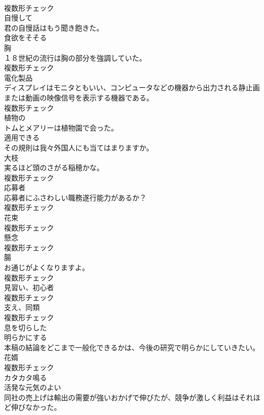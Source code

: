 \documentclass[8pt]{extreport}
\begin{document}
\begin{CJK}{UTF8}{min}
\\	複数形チェック
\\	[形容詞]	自慢して	
\\	君の自慢話はもう聞き飽きた。	
\\	[形容詞]	食欲をそそる	
\\	[名詞]	胸	
\\	１８世紀の流行は胸の部分を強調していた。	
\\	複数形チェック
\\	[名詞]	電化製品	
\\	ディスプレイはモニタともいい、コンピュータなどの機器から出力される静止画または動画の映像信号を表示する機器である。	
\\	複数形チェック
\\	[形容詞]	植物の	
\\	トムとメアリーは植物園で会った。	
\\	[形容詞]	適用できる	
\\	その規則は我々外国人にも当てはまりますか。	
\\	[名詞]	大枝	
\\	実るほど頭のさがる稲穂かな。	
\\	複数形チェック
\\	[名詞]	応募者	
\\	応募者にふさわしい職務遂行能力があるか？	
\\	複数形チェック
\\	[名詞]	花束	
\\	複数形チェック
\\	[名詞]	懸念	
\\	複数形チェック
\\	[名詞]	腸	
\\	お通じがよくなりますよ。	
\\	複数形チェック
\\	[名詞]	見習い、初心者	
\\	複数形チェック
\\	[名詞]	支え、同類	
\\	複数形チェック
\\	[形容詞]	息を切らした	
\\	[動詞]	明らかにする	
\\	本稿の結論をどこまで一般化できるかは、今後の研究で明らかにしていきたい。	
\\	[名詞]	花婿	
\\	複数形チェック
\\	[動詞]	カタカタ鳴る	
\\	[形容詞]	活発な元気のよい	
\\	同社の売上げは輸出の需要が強いおかげで伸びたが、競争が激しく利益はそれほど伸びなかった。	

\end{CJK}
\end{document}
